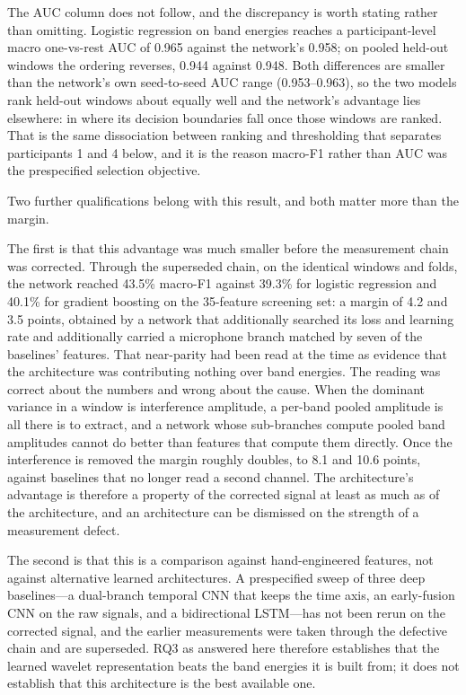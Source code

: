 \documentclass[pdflatex,sn-nature,iicol]{sn-jnl}
\begin{document}
The AUC column does not follow, and the discrepancy is worth stating rather than omitting. Logistic regression on band energies reaches a participant-level macro one-vs-rest AUC of 0.965 against the network's 0.958; on pooled held-out windows the ordering reverses, 0.944 against 0.948. Both differences are smaller than the network's own seed-to-seed AUC range (0.953--0.963), so the two models rank held-out windows about equally well and the network's advantage lies elsewhere: in where its decision boundaries fall once those windows are ranked. That is the same dissociation between ranking and thresholding that separates participants 1 and 4 below, and it is the reason macro-F1 rather than AUC was the prespecified selection objective.

Two further qualifications belong with this result, and both matter more than the margin.

The first is that this advantage was much smaller before the measurement chain was corrected. Through the superseded chain, on the identical windows and folds, the network reached 43.5\% macro-F1 against 39.3\% for logistic regression and 40.1\% for gradient boosting on the 35-feature screening set: a margin of 4.2 and 3.5 points, obtained by a network that additionally searched its loss and learning rate and additionally carried a microphone branch matched by seven of the baselines' features. That near-parity had been read at the time as evidence that the architecture was contributing nothing over band energies. The reading was correct about the numbers and wrong about the cause. When the dominant variance in a window is interference amplitude, a per-band pooled amplitude is all there is to extract, and a network whose sub-branches compute pooled band amplitudes cannot do better than features that compute them directly. Once the interference is removed the margin roughly doubles, to 8.1 and 10.6 points, against baselines that no longer read a second channel. The architecture's advantage is therefore a property of the corrected signal at least as much as of the architecture, and an architecture can be dismissed on the strength of a measurement defect.

The second is that this is a comparison against hand-engineered features, not against alternative learned architectures. A prespecified sweep of three deep baselines---a dual-branch temporal CNN that keeps the time axis, an early-fusion CNN on the raw signals, and a bidirectional LSTM---has not been rerun on the corrected signal, and the earlier measurements were taken through the defective chain and are superseded. RQ3 as answered here therefore establishes that the learned wavelet representation beats the band energies it is built from; it does not establish that this architecture is the best available one.
\end{document}
